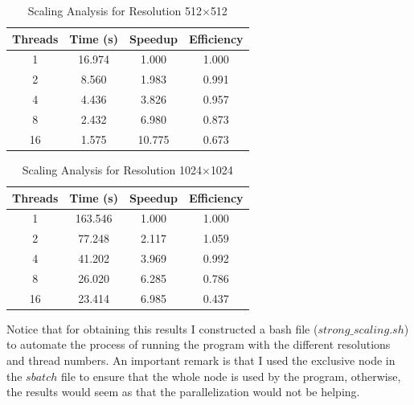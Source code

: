 \documentclass[unicode,11pt,a4paper,oneside,numbers=endperiod,openany]{scrartcl}
\begin{document}
\begin{table}[h!]
    \centering
    \caption{Scaling Analysis for Resolution 512$\times$512}
    \begin{tabular}{cccc}
        \toprule
        Threads & Time (s) & Speedup & Efficiency \\
        \midrule
        1  & 16.974 & 1.000 & 1.000 \\
        2  & 8.560  & 1.983 & 0.991 \\
        4  & 4.436  & 3.826 & 0.957 \\
        8  & 2.432  & 6.980 & 0.873 \\
        16 & 1.575  & 10.775 & 0.673 \\
        \bottomrule
    \end{tabular}
\end{table}

\begin{table}[h!]
    \centering
    \caption{Scaling Analysis for Resolution 1024$\times$1024}
    \begin{tabular}{cccc}
        \toprule
        Threads & Time (s) & Speedup & Efficiency \\
        \midrule
        1  & 163.546 & 1.000 & 1.000 \\
        2  & 77.248  & 2.117 & 1.059 \\
        4  & 41.202  & 3.969 & 0.992 \\
        8  & 26.020  & 6.285 & 0.786 \\
        16 & 23.414  & 6.985 & 0.437 \\
        \bottomrule
    \end{tabular}
\end{table}

Notice that for obtaining this results I constructed a bash file ($strong\_scaling.sh$)
to automate the process of running the program with the different resolutions and 
thread numbers. An important remark is that I used the exclusive node in the 
$sbatch$ file to ensure that the whole node is used by the program, otherwise, the 
results would seem as that the parallelization would not be helping.
\end{document}
